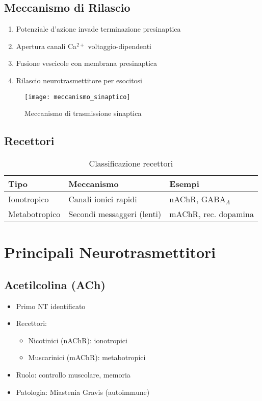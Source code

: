 \documentclass[12pt]{article}
\begin{document}
\subsection{Meccanismo di Rilascio}
\begin{enumerate}
    \item Potenziale d'azione invade terminazione presinaptica
    \item Apertura canali Ca$^{2+}$ voltaggio-dipendenti
    \item Fusione vescicole con membrana presinaptica
    \item Rilascio neurotrasmettitore per esocitosi
\end{enumerate}

\begin{figure}[h]
    \centering
    \texttt{[image: meccanismo\_sinaptico]}
    \caption{Meccanismo di trasmissione sinaptica}
\end{figure}

\subsection{Recettori}
\begin{table}[h]
    \centering
    \begin{tabular}{lll}
        \toprule
        \textbf{Tipo} & \textbf{Meccanismo} & \textbf{Esempi} \\
        \midrule
        Ionotropico & Canali ionici rapidi & nAChR, GABA$_A$ \\
        Metabotropico & Secondi messaggeri (lenti) & mAChR, rec. dopamina \\
        \bottomrule
    \end{tabular}
    \caption{Classificazione recettori}
\end{table}

\section{Principali Neurotrasmettitori}
\subsection{Acetilcolina (ACh)}
\begin{itemize}
    \item Primo NT identificato
    \item Recettori:
    \begin{itemize}
        \item Nicotinici (nAChR): ionotropici
        \item Muscarinici (mAChR): metabotropici
    \end{itemize}
    \item Ruolo: controllo muscolare, memoria
    \item Patologia: Miastenia Gravis (autoimmune)
\end{itemize}
\end{document}
